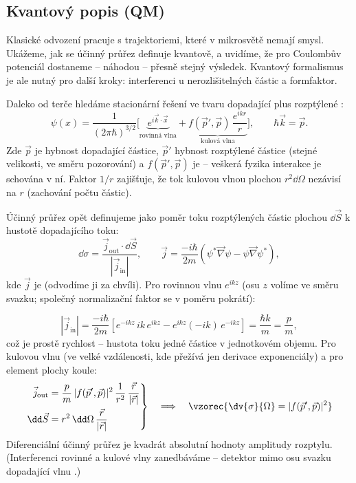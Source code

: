 \subsection{Kvantový popis (QM)}

Klasické odvození pracuje s trajektoriemi, které v mikrosvětě nemají smysl. Ukážeme, jak se účinný průřez definuje kvantově, a uvidíme, že pro Coulombův potenciál dostaneme -- náhodou -- přesně stejný výsledek. Kvantový formalismus je ale nutný pro další kroky: interferenci u nerozlišitelných částic a formfaktor.

Daleko od terče hledáme stacionární řešení ve tvaru dopadající  plus rozptýlené :
\begin{equation}
  \psi(x) = \frac{1}{(2\pi\hbar)^{3/2}}\Big[\underbrace{e^{i\vec k\cdot\vec x}}_{\text{rovinná vlna}} + \underbrace{f(\vec p',\vec p)\,\frac{e^{ikr}}{r}}_{\text{kulová vlna}}\Big],
  \qquad \hbar\vec k = \vec p .
\end{equation}
Zde $\vec p$ je hybnost dopadající částice, $\vec p'$ hybnost rozptýlené částice (stejné velikosti, ve směru pozorování) a $f(\vec p',\vec p)$ je  -- veškerá fyzika interakce je schována v ní. Faktor $1/r$ zajišťuje, že tok kulovou vlnou plochou $r^2\dd\Omega$ nezávisí na $r$ (zachování počtu částic).

Účinný průřez opět definujeme jako poměr toku rozptýlených částic plochou $\dd\vec S$ k hustotě dopadajícího toku:
\begin{equation}
  \dd\sigma = \frac{\vec j_{\mathrm{out}}\cdot\dd\vec S}{|\vec j_{\mathrm{in}}|},
  \qquad
  \vec j = \frac{-i\hbar}{2m}\left(\psi^*\vec\nabla\psi - \psi\vec\nabla\psi^*\right),
\end{equation}
kde $\vec j$ je  (odvodíme ji za chvíli). Pro rovinnou vlnu $e^{ikz}$ (osu $z$ volíme ve směru svazku; společný normalizační faktor se v poměru pokrátí):

\begin{equation}
  |\vec j_{\mathrm{in}}| = \frac{-i\hbar}{2m}\left[e^{-ikz}\,ik\,e^{ikz} - e^{ikz}(-ik)\,e^{-ikz}\right] = \frac{\hbar k}{m} = \frac{p}{m},
\end{equation}
což je prostě rychlost -- hustota toku jedné částice v jednotkovém objemu. Pro kulovou vlnu (ve velké vzdálenosti, kde přežívá jen derivace exponenciály) a pro element plochy koule:
\begin{equation}
  \left.
  \begin{aligned}
    \vec j_{\mathrm{out}} &= \frac{p}{m}\,|f(\vec p',\vec p)|^2\,\frac{1}{r^2}\,\frac{\vec r}{|\vec r|}\\
    \dd\vec S &= r^2\,\dd\Omega\,\frac{\vec r}{|\vec r|}
  \end{aligned}
  \right\}
  \quad\Longrightarrow\quad
  \vzorec{\dv{\sigma}{\Omega} = |f(\vec p',\vec p)|^2}
\end{equation}
Diferenciální účinný průřez je kvadrát absolutní hodnoty amplitudy rozptylu. (Interferenci rovinné a kulové vlny zanedbáváme -- detektor mimo osu svazku dopadající vlnu .)

